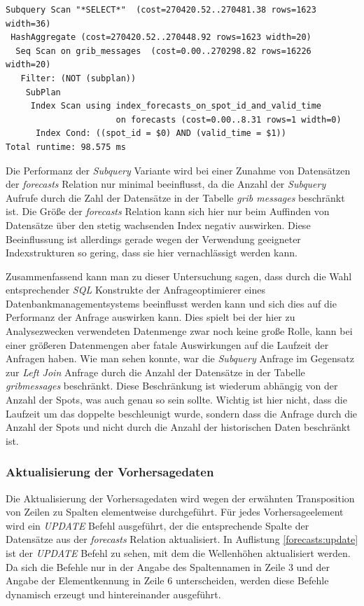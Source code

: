 \begin{lstlisting}[captionpos=b, caption=Ausführungsplan der Subquery, label=forecasts:explain_2]
Subquery Scan "*SELECT*"  (cost=270420.52..270481.38 rows=1623 width=36)
 HashAggregate (cost=270420.52..270448.92 rows=1623 width=20)
  Seq Scan on grib_messages  (cost=0.00..270298.82 rows=16226 width=20)
   Filter: (NOT (subplan))
    SubPlan
     Index Scan using index_forecasts_on_spot_id_and_valid_time 
                      on forecasts (cost=0.00..8.31 rows=1 width=0)
      Index Cond: ((spot_id = $0) AND (valid_time = $1))
Total runtime: 98.575 ms
\end{lstlisting}

Die Performanz der \textit{Subquery} Variante wird bei einer Zunahme
von Datensätzen der \textit{forecasts} Relation nur minimal
beeinflusst, da die Anzahl der \textit{Subquery} Aufrufe durch die
Zahl der Datensätze in der Tabelle \textit{grib\textunderscore
  messages} beschränkt ist. Die Größe der \textit{forecasts} Relation
kann sich hier nur beim Auffinden von Datensätze über den stetig
wachsenden Index negativ auswirken. Diese Beeinflussung ist allerdings
gerade wegen der Verwendung geeigneter Indexstrukturen so gering, dass
sie hier vernachlässigt werden kann.

Zusammenfassend kann man zu dieser Untersuchung sagen, dass durch die
Wahl entsprechender \textit{SQL} Konstrukte der Anfrageoptimierer
eines Datenbankmanagementsystems beeinflusst werden kann und sich
dies auf die Performanz der Anfrage auswirken kann. Dies spielt bei
der hier zu Analysezwecken verwendeten Datenmenge zwar noch keine
große Rolle, kann bei einer größeren Datenmengen aber fatale
Auswirkungen auf die Laufzeit der Anfragen haben. Wie man sehen
konnte, war die \textit{Subquery} Anfrage im Gegensatz zur
\textit{Left Join} Anfrage durch die Anzahl der Datensätze in der
Tabelle \textit{grib\textunderscore messages} beschränkt. Diese
Beschränkung ist wiederum abhängig von der Anzahl der Spots, was auch
genau so sein sollte. Wichtig ist hier nicht, dass die Laufzeit um das
doppelte beschleunigt wurde, sondern dass die Anfrage durch die Anzahl
der Spots und nicht durch die Anzahl der historischen Daten beschränkt
ist.

\subsubsection{Aktualisierung der Vorhersagedaten}
Die Aktualisierung der Vorhersagedaten wird wegen der erwähnten
Transposition von Zeilen zu Spalten elementweise durchgeführt. Für
jedes Vorhersageelement wird ein \textit{UPDATE} Befehl ausgeführt,
der die entsprechende Spalte der Datensätze aus der \textit{forecasts}
Relation aktualisiert. In Auflistung \ref{forecasts:update} ist der
\textit{UPDATE} Befehl zu sehen, mit dem die Wellenhöhen aktualisiert
werden. Da sich die Befehle nur in der Angabe des Spaltennamen in
Zeile 3 und der Angabe der Elementkennung in Zeile 6 unterscheiden,
werden diese Befehle dynamisch erzeugt und hintereinander ausgeführt.

